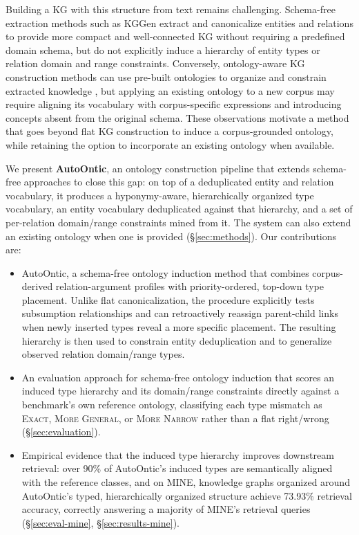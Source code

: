 \documentclass[11pt]{article}
\begin{document}
Building a KG with this structure from text remains challenging. Schema-free extraction methods such as KGGen \citep{mo2025kggen} extract and canonicalize entities and relations to provide more compact and well-connected KG without requiring a predefined domain schema, but do not explicitly induce a hierarchy of entity types or relation domain and range constraints. Conversely, ontology-aware KG construction methods can use pre-built ontologies to organize and constrain extracted knowledge \citep{chepurova2026wikontic}, but applying an existing ontology to a new corpus may require aligning its vocabulary with corpus-specific expressions and introducing concepts absent from the original schema. These observations motivate a method that goes beyond flat KG construction to induce a corpus-grounded ontology, while retaining the option to incorporate an existing ontology when available.


We present \textbf{AutoOntic}, an ontology construction pipeline that extends schema-free approaches to close this gap: on top of a deduplicated entity and relation vocabulary, it produces a
hyponymy-aware, hierarchically organized type vocabulary, an entity
vocabulary deduplicated against that hierarchy, and a set of
per-relation domain/range constraints mined from it. The system can also extend an existing ontology when one is provided (\S\ref{sec:methods}). Our contributions are:
\begin{itemize}
  \item AutoOntic, a schema-free ontology induction method that combines corpus-derived relation-argument profiles with priority-ordered, top-down type placement. Unlike flat canonicalization, the procedure explicitly tests subsumption relationships and can retroactively reassign parent-child links when newly inserted types reveal a more specific placement. The resulting hierarchy is then used to constrain entity deduplication and to generalize observed relation domain/range types.
  \item An evaluation approach for schema-free ontology induction that scores an induced type hierarchy and its domain/range constraints directly against a benchmark's own reference ontology, classifying each type mismatch as \textsc{Exact}, \textsc{More General}, or \textsc{More Narrow} rather than a flat right/wrong (\S\ref{sec:evaluation}).
  \item Empirical evidence that the induced type hierarchy improves downstream retrieval: over 90\% of AutoOntic's induced types are semantically aligned with the reference classes, and on MINE, knowledge graphs organized around AutoOntic's typed, hierarchically organized structure achieve 73.93\% retrieval accuracy, correctly answering a majority of MINE's retrieval queries (\S\ref{sec:eval-mine}, \S\ref{sec:results-mine}).
\end{itemize}
\end{document}
